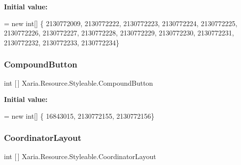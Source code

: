 {\bfseries Initial value\+:}
\begin{DoxyCode}
= \textcolor{keyword}{new} \textcolor{keywordtype}{int}[] \{
                    2130772009,
                    2130772222,
                    2130772223,
                    2130772224,
                    2130772225,
                    2130772226,
                    2130772227,
                    2130772228,
                    2130772229,
                    2130772230,
                    2130772231,
                    2130772232,
                    2130772233,
                    2130772234\}
\end{DoxyCode}
\mbox{\label{classXaria_1_1Resource_1_1Styleable_a4f1a4d68bf434a792b61d2be87b59638}} 
\subsubsection{\texorpdfstring{Compound\+Button}{CompoundButton}}
{\footnotesize\ttfamily int \mbox{[}$\,$\mbox{]} Xaria.\+Resource.\+Styleable.\+Compound\+Button\hspace{0.3cm}{\ttfamily [static]}}

{\bfseries Initial value\+:}
\begin{DoxyCode}
= \textcolor{keyword}{new} \textcolor{keywordtype}{int}[] \{
                    16843015,
                    2130772155,
                    2130772156\}
\end{DoxyCode}
\mbox{\label{classXaria_1_1Resource_1_1Styleable_a3bfff8908793f9c025a310a245d94c32}} 
\subsubsection{\texorpdfstring{Coordinator\+Layout}{CoordinatorLayout}}
{\footnotesize\ttfamily int \mbox{[}$\,$\mbox{]} Xaria.\+Resource.\+Styleable.\+Coordinator\+Layout\hspace{0.3cm}{\ttfamily [static]}}

